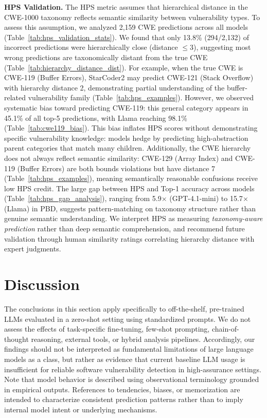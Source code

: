 \documentclass[lettersize,journal]{IEEEtran}
\begin{document}
\textbf{HPS Validation.}
The \gls{HPS} metric assumes that hierarchical distance in the CWE-1000 taxonomy reflects semantic similarity between vulnerability types.
To assess this assumption, we analyzed 2,159 CWE predictions across all models (Table~\ref{tab:hps_validation_stats}).
We found that only 13.8\% (294/2,132) of incorrect predictions were hierarchically close (distance $\leq$3), suggesting most wrong predictions are taxonomically distant from the true CWE (Table~\ref{tab:hierarchy_distance_dist}).
For example, when the true CWE is CWE-119 (Buffer Errors), StarCoder2 may predict CWE-121 (Stack Overflow) with hierarchy distance 2, demonstrating partial understanding of the buffer-related vulnerability family (Table~\ref{tab:hps_examples}).
However, we observed systematic bias toward predicting CWE-119: this general category appears in 45.1\% of all top-5 predictions, with Llama reaching 98.1\% (Table~\ref{tab:cwe119_bias}).
This bias inflates \gls{HPS} scores without demonstrating specific vulnerability knowledge: models hedge by predicting high-abstraction parent categories that match many children.
Additionally, the CWE hierarchy does not always reflect semantic similarity: CWE-129 (Array Index) and CWE-119 (Buffer Errors) are both bounds violations but have distance 7 (Table~\ref{tab:hps_examples}), meaning semantically reasonable confusions receive low \gls{HPS} credit.
The large gap between \gls{HPS} and Top-1 accuracy across models (Table~\ref{tab:hps_gap_analysis}), ranging from 5.9$\times$ (GPT-4.1-mini) to 15.7$\times$ (Llama) in PBD, suggests pattern-matching on taxonomy structure rather than genuine semantic understanding.
We interpret \gls{HPS} as measuring \textit{taxonomy-aware prediction} rather than deep semantic comprehension, and recommend future validation through human similarity ratings correlating hierarchy distance with expert judgments.

\section{Discussion}
\label{section:discussion}

The conclusions in this section apply specifically to off-the-shelf, pre-trained LLMs evaluated in a zero-shot setting using standardized prompts. We do not assess the effects of task-specific fine-tuning, few-shot prompting, chain-of-thought reasoning, external tools, or hybrid analysis pipelines. Accordingly, our findings should not be interpreted as fundamental limitations of large language models as a class, but rather as evidence that current baseline LLM usage is insufficient for reliable software vulnerability detection in high-assurance settings. Note that model behavior is described using observational terminology grounded in empirical outputs. References to tendencies, biases, or memorization are intended to characterize consistent prediction patterns rather than to imply internal model intent or underlying mechanisms.
\end{document}
